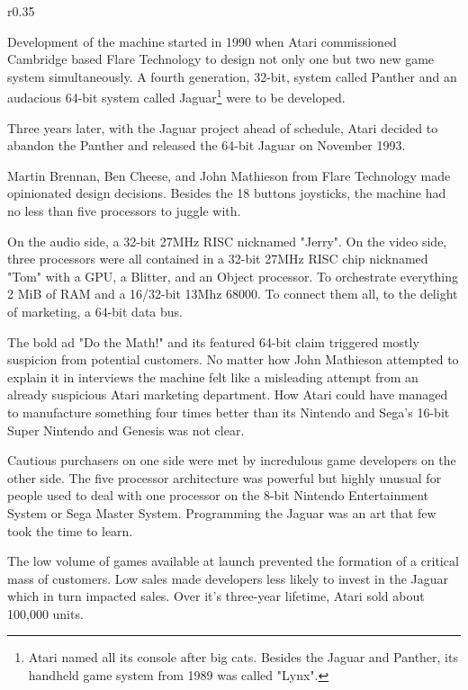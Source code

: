 \begin{wrapfigure}[5]{r}{0.35\textwidth}{
\centering {}}
\end{wrapfigure}
Development of the machine started in 1990 when Atari commissioned Cambridge based Flare Technology to design not only one but two new game system simultaneously. A fourth generation, 32-bit, system called Panther and an audacious 64-bit system called Jaguar\footnote{Atari named all its console after big cats. Besides the Jaguar and Panther, its handheld game system from 1989 was called "Lynx".} were to be developed.\\
\par Three years later, with the Jaguar project ahead of schedule, Atari decided to abandon the Panther and released the 64-bit Jaguar on November 1993.\\
\par
{}
\par
Martin Brennan, Ben Cheese, and John Mathieson from Flare Technology made opinionated design decisions. Besides the 18 buttons joysticks, the machine had no less than five processors to juggle with.\\
\par
On the audio side, a 32-bit 27MHz RISC nicknamed "Jerry". On the video side, three processors were all contained in a 32-bit 27MHz RISC chip nicknamed "Tom" with a GPU, a Blitter, and an Object processor. To orchestrate everything 2 MiB of RAM and a 16/32-bit 13Mhz 68000. To connect them all, to the delight of marketing, a 64-bit data bus.\\
\par
The bold ad "Do the Math!" and its featured 64-bit claim triggered mostly suspicion from potential customers.  No matter how John Mathieson attempted to explain it in interviews the machine felt like a misleading attempt from an already suspicious Atari marketing department. How Atari could have managed to manufacture something four times better than its Nintendo and Sega's 16-bit Super Nintendo and Genesis was not clear.
\par
Cautious purchasers on one side were met by incredulous game developers on the other side. The five processor architecture was powerful but highly unusual for people used to deal with one processor on the 8-bit Nintendo Entertainment System or Sega Master System. Programming the Jaguar was an art that few took the time to learn.\\
\par
The low volume of games available at launch prevented the formation of a critical mass of customers. Low sales made developers less likely to invest in the Jaguar which in turn impacted sales. Over it's three-year lifetime, Atari sold about 100,000 units. 


